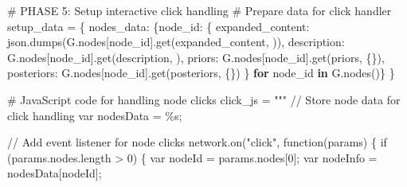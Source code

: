 \documentclass[
  11pt,
  letterpaper,
]{book}
\newenvironment{Shaded}{\begin{snugshade}}{\end{snugshade}}
\newcommand{\CommentTok}[1]{\textcolor[rgb]{0.37,0.37,0.37}{#1}}
\newcommand{\ControlFlowTok}[1]{\textcolor[rgb]{0.00,0.23,0.31}{\textbf{#1}}}
\newcommand{\KeywordTok}[1]{\textcolor[rgb]{0.00,0.23,0.31}{\textbf{#1}}}
\newcommand{\NormalTok}[1]{\textcolor[rgb]{0.00,0.23,0.31}{#1}}
\newcommand{\OperatorTok}[1]{\textcolor[rgb]{0.37,0.37,0.37}{#1}}
\newcommand{\SpecialCharTok}[1]{\textcolor[rgb]{0.37,0.37,0.37}{#1}}
\newcommand{\StringTok}[1]{\textcolor[rgb]{0.13,0.47,0.30}{#1}}
\begin{document}
\begin{Shaded}
\begin{Highlighting}[]
    \CommentTok{\# PHASE 5: Setup interactive click handling}
    \CommentTok{\# Prepare data for click handler}
\NormalTok{    setup\_data }\OperatorTok{=}\NormalTok{ \{}
        \StringTok{\textquotesingle{}nodes\_data\textquotesingle{}}\NormalTok{: \{node\_id: \{}
            \StringTok{\textquotesingle{}expanded\_content\textquotesingle{}}\NormalTok{: json.dumps(G.nodes[node\_id].get(}\StringTok{\textquotesingle{}expanded\_content\textquotesingle{}}\NormalTok{, }\StringTok{\textquotesingle{}\textquotesingle{}}\NormalTok{)),}
            \StringTok{\textquotesingle{}description\textquotesingle{}}\NormalTok{: G.nodes[node\_id].get(}\StringTok{\textquotesingle{}description\textquotesingle{}}\NormalTok{, }\StringTok{\textquotesingle{}\textquotesingle{}}\NormalTok{),}
            \StringTok{\textquotesingle{}priors\textquotesingle{}}\NormalTok{: G.nodes[node\_id].get(}\StringTok{\textquotesingle{}priors\textquotesingle{}}\NormalTok{, \{\}),}
            \StringTok{\textquotesingle{}posteriors\textquotesingle{}}\NormalTok{: G.nodes[node\_id].get(}\StringTok{\textquotesingle{}posteriors\textquotesingle{}}\NormalTok{, \{\})}
\NormalTok{        \} }\ControlFlowTok{for}\NormalTok{ node\_id }\KeywordTok{in}\NormalTok{ G.nodes()\}}
\NormalTok{    \}}

    \CommentTok{\# JavaScript code for handling node clicks}
\NormalTok{    click\_js }\OperatorTok{=} \StringTok{"""}
\StringTok{    // Store node data for click handling}
\StringTok{    var nodesData = }\SpecialCharTok{\%s}\StringTok{;}

\StringTok{    // Add event listener for node clicks}
\StringTok{    network.on("click", function(params) \{}
\StringTok{        if (params.nodes.length \textgreater{} 0) \{}
\StringTok{            var nodeId = params.nodes[0];}
\StringTok{            var nodeInfo = nodesData[nodeId];}


\end{Highlighting}
\end{Shaded}
\end{document}
